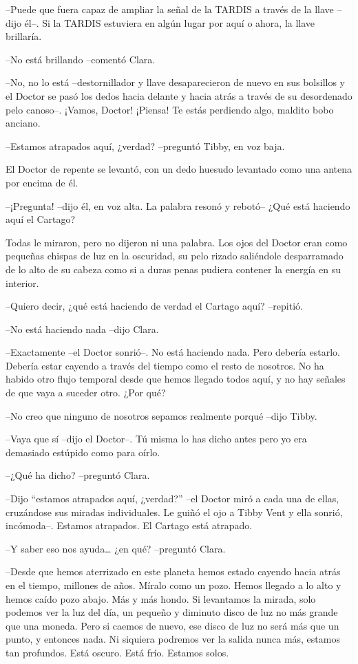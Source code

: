 {--Puede que fuera capaz de ampliar la señal de la TARDIS a través de la
 llave --dijo él--. Si la TARDIS estuviera en algún lugar por aquí o
ahora, la llave brillaría.}

{--No está brillando --comentó Clara.}

{--No, no lo está --destornillador y llave desaparecieron de nuevo en sus
 bolsillos y el Doctor se pasó los dedos hacia delante y hacia atrás a
 través de su desordenado pelo canoso--. ¡Vamos, Doctor! ¡Piensa! Te
estás perdiendo algo, maldito bobo anciano.}

{--Estamos atrapados aquí, ¿verdad? --preguntó Tibby, en voz baja.}

{El Doctor de repente se levantó, con un dedo huesudo levantado como una
antena por encima de él.}

{--¡Pregunta! --dijo él, en voz alta. La palabra resonó y rebotó-- ¿Qué
está haciendo aquí el Cartago?}

{Todas le miraron, pero no dijeron ni una palabra. Los ojos del Doctor
 eran como pequeñas chispas de luz en la oscuridad, su pelo rizado
 saliéndole desparramado de lo alto de su cabeza como si a duras penas
pudiera contener la energía en su interior.}

{--Quiero decir, ¿qué está haciendo de verdad el Cartago aquí?
--repitió.}

{--No está haciendo nada --dijo Clara.}

{--Exactamente --el Doctor sonrió--. No está haciendo nada. Pero debería
 estarlo. Debería estar cayendo a través del tiempo como el resto de
 nosotros. No ha habido otro flujo temporal desde que hemos llegado todos
aquí, y no hay señales de que vaya a suceder otro. ¿Por qué?}

{--No creo que ninguno de nosotros sepamos realmente porqué --dijo
Tibby.}

{--Vaya que sí --dijo el Doctor--. Tú misma lo has dicho antes pero yo
era demasiado estúpido como para oírlo.}

{--¿Qué ha dicho? --preguntó Clara.}

{--Dijo ``estamos atrapados aquí, ¿verdad?'' --el Doctor miró a cada una
 de ellas, cruzándose sus miradas individuales. Le guiñó el ojo a Tibby
 Vent y ella sonrió, incómoda--. Estamos atrapados. El Cartago está
atrapado.}

{--Y saber eso nos ayuda\ldots{} ¿en qué? --preguntó Clara.}

{--Desde que hemos aterrizado en este planeta hemos estado cayendo hacia
 atrás en el tiempo, millones de años. Míralo como un pozo. Hemos llegado
 a lo alto y hemos caído pozo abajo. Más y más hondo. Si levantamos la
 mirada, solo podemos ver la luz del día, un pequeño y diminuto disco de
 luz no más grande que una moneda. Pero si caemos de nuevo, ese disco de
 luz no será más que un punto, y entonces nada. Ni siquiera podremos ver
 la salida nunca más, estamos tan profundos. Está oscuro. Está frío.
Estamos solos.}

